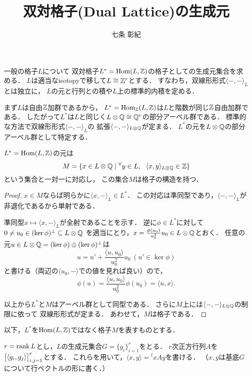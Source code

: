 \documentclass[a4paper]{jsarticle}
\newcommand{\form}[2]{\langle #1,#2 \rangle}
\begin{document}
\title{双対格子(Dual Lattice)の生成元}
\author{七条 彰紀}
\maketitle
    一般の格子$L$について
    双対格子$L^*=\operatorname{Hom}(L, \mathbb{Z})$の格子としての生成元集合を求める．
    $L$は適当なisotopyで移して$L \cong \mathbb{Z}^r$とする．
    すなわち，双線形形式$\form{-}{-}_L$とは独立に，
    $L$の元と行列との積や$L$上の標準的内積を定める．
    
    まず$L$は自由$\mathbb{Z}$加群であるから，
    $L^*=\operatorname{Hom}_{\mathbb{Z}}(L, \mathbb{Z})$は$L$と階数が同じ$\mathbb{Z}$自由加群である．
    したがって$L^*$は$L$と同じく$L \otimes \mathbb{Q} \cong \mathbb{Q}^r$の部分アーベル群である．
    標準的な方法で双線形形式$\form{-}{-}_{L}$の
    拡張$\form{-}{-}_{L \otimes \Q}$が定まる．
    $L^*$の元を$L \otimes \mathbb{Q}$の部分アーベル群として特定する．

    \begin{Claim}
        $L^*=\operatorname{Hom}(L, \mathbb{Z})$の元は
        \[ M=\{ x \in L \otimes \Q \mid \Forall{y \in L} \form{x}{y}_{L \otimes \Q} \in \Z \} \]
        という集合と一対一に対応し，
        この集合$M$は格子の構造を持つ．
    \end{Claim}
    \begin{proof}
        $x \in M$ならば明らかに$\form{x}{-}_{L} \in L^*$．
        この対応は準同型であり，$\form{-}{-}_L$が非退化であるから単射である．

        準同型$x \mapsto \form{x}{-}_L$が全射であることを示す．
        逆に$\phi \in L^*$に対して
        $0 \neq u_0 \in (\ker \phi)^{\perp} \subseteq L \otimes \mathbb{Q}$
        を適当にとり，$x=\frac{\phi(u_0)}{u_0^2}u_0 \in L \otimes \mathbb{Q}$とおく．
        任意の元$u \in L \otimes \mathbb{Q}=(\ker \phi) \oplus (\ker \phi)^{\perp}$は
        \[ u=u'+\frac{\form{u}{u_0}}{u_0^2} u_0 \ (u' \in \ker \phi) \]
        と書ける（両辺の$\form{u_0}{-}$での値を見れば良い）ので，
        \[ \phi(u)=\frac{\form{u}{u_0}}{u_0^2} \phi(u_0)=\form{u}{x}.  \]

        以上から$L^*$と$M$はアーベル群として同型である．
        さらに$M$上には$\form{-}{-}_{L \otimes \Q}$の制限に依って
        双線形形式が定まる．
        あわせて，$M$は格子である．
    \end{proof}
    以下，$L^*$を$\operatorname{Hom}(L, \mathbb{Z})$ではなく格子$M$を表すものとする．

    $r=\operatorname{rank} L$とし，$L$の生成元集合$G=\{g_i\}_{i=1}^r$をとる．
    $r$次正方行列$A$を$\mat{ \form{g_i}{g_j} }_{i,j=1}^r$とする．
    これらを用いて，$\form{x}{y}={}^t x A y$を書ける．
    （$x, y$は基底$G$について行ベクトルの形に書く．）
\end{document}
